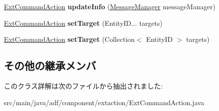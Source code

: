 \begin{DoxyCompactItemize}
\hypertarget{classadf_1_1component_1_1extaction_1_1ExtCommandAction_a1194d75e3bd1c8953b4d30cdac47400f}{}\label{classadf_1_1component_1_1extaction_1_1ExtCommandAction_a1194d75e3bd1c8953b4d30cdac47400f} 
\hyperlink{classadf_1_1component_1_1extaction_1_1ExtCommandAction}{Ext\+Command\+Action} {\bfseries update\+Info} (\hyperlink{classadf_1_1agent_1_1communication_1_1MessageManager}{Message\+Manager} message\+Manager)
\item 
\hypertarget{classadf_1_1component_1_1extaction_1_1ExtCommandAction_a810e1ecb2ef1551e05d3e956d4752317}{}\label{classadf_1_1component_1_1extaction_1_1ExtCommandAction_a810e1ecb2ef1551e05d3e956d4752317} 
\hyperlink{classadf_1_1component_1_1extaction_1_1ExtCommandAction}{Ext\+Command\+Action} {\bfseries set\+Target} (Entity\+I\+D... targets)
\item 
\hypertarget{classadf_1_1component_1_1extaction_1_1ExtCommandAction_a335e48bf82dcdd93e714281073b6f3c7}{}\label{classadf_1_1component_1_1extaction_1_1ExtCommandAction_a335e48bf82dcdd93e714281073b6f3c7} 
\hyperlink{classadf_1_1component_1_1extaction_1_1ExtCommandAction}{Ext\+Command\+Action} {\bfseries set\+Target} (Collection$<$ Entity\+ID $>$ targets)
\end{DoxyCompactItemize}
\subsection*{その他の継承メンバ}


このクラス詳解は次のファイルから抽出されました\+:\begin{DoxyCompactItemize}
\item 
src/main/java/adf/component/extaction/Ext\+Command\+Action.\+java\end{DoxyCompactItemize}
